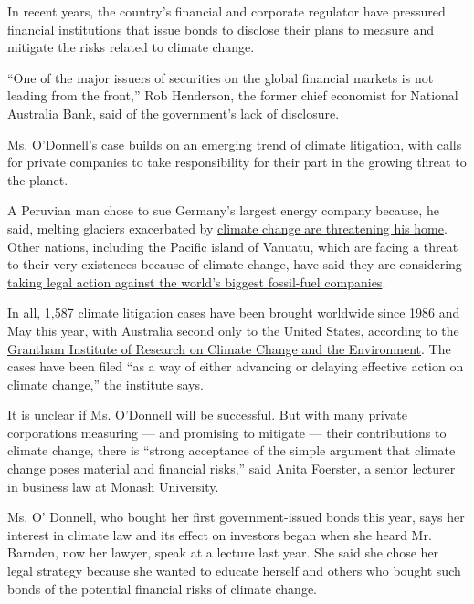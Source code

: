 In recent years, the country's financial and corporate regulator have
pressured financial institutions that issue bonds to disclose their
plans to measure and mitigate the risks related to climate change.

``One of the major issuers of securities on the global financial markets
is not leading from the front,'' Rob Henderson, the former chief
economist for National Australia Bank, said of the government's lack of
disclosure.

Ms. O'Donnell's case builds on an emerging trend of climate litigation,
with calls for private companies to take responsibility for their part
in the growing threat to the planet.

A Peruvian man chose to sue Germany's largest energy company because, he
said, melting glaciers exacerbated by
\href{https://www.nytimes.com/interactive/2019/04/09/magazine/climate-change-peru-law.html}{climate
change are threatening his home}. Other nations, including the Pacific
island of Vanuatu, which are facing a threat to their very existences
because of climate change, have said they are considering
\href{https://edition.cnn.com/2018/12/17/world/vanuatu-cop-climate-change-intl/index.html}{taking
legal action against the world's biggest fossil-fuel companies}.

In all, 1,587 climate litigation cases have been brought worldwide since
1986 and May this year, with Australia second only to the United States,
according to the
\href{http://www.lse.ac.uk/granthaminstitute/publication/global-trends-in-climate-change-litigation-2020-snapshot/}{Grantham
Institute of Research on Climate Change and the Environment}. The cases
have been filed ``as a way of either advancing or delaying effective
action on climate change,'' the institute says.

It is unclear if Ms. O'Donnell will be successful. But with many private
corporations measuring --- and promising to mitigate --- their
contributions to climate change, there is ``strong acceptance of the
simple argument that climate change poses material and financial
risks,'' said Anita Foerster, a senior lecturer in business law at
Monash University.

Ms. O' Donnell, who bought her first government-issued bonds this year,
says her interest in climate law and its effect on investors began when
she heard Mr. Barnden, now her lawyer, speak at a lecture last year. She
said she chose her legal strategy because she wanted to educate herself
and others who bought such bonds of the potential financial risks of
climate change.

